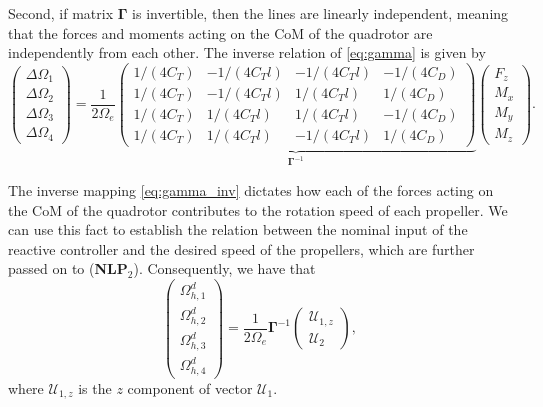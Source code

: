 Second, if matrix $\mathbf{\Gamma}$ is invertible, then the lines are linearly independent, meaning that the forces and moments acting on the CoM of the quadrotor are independently from each other. The inverse relation  of \eqref{eq:gamma} is given by
\begin{equation}
\begin{pmatrix}\Delta \Omega_1\\ \Delta \Omega_2\\ \Delta \Omega_3\\ \Delta \Omega_4\end{pmatrix} = \frac{1}{2\Omega_e}\underbrace{\begin{pmatrix}
1/(4C_T) & -1/(4C_Tl) & -1/(4C_Tl) & -1/(4C_D)\\
1/(4C_T) & -1/(4C_Tl) & 1/(4C_Tl) & 1/(4C_D)\\
1/(4C_T) & 1/(4C_Tl) & 1/(4C_Tl) & -1/(4C_D)\\
1/(4C_T) & 1/(4C_Tl) & -1/(4C_Tl) & 1/(4C_D)
\end{pmatrix}}_{\mathbf{\Gamma}^{-1}}
\begin{pmatrix}F_z \\M_x \\M_y \\M_z \end{pmatrix}.\label{eq:gamma_inv}%
\end{equation}

The inverse mapping \eqref{eq:gamma_inv} dictates how each of the forces acting on the CoM of the quadrotor contributes to the rotation speed of each propeller. We can use this fact to establish the relation between the nominal input of the reactive controller and the desired speed of the propellers, which are further passed on to (\textbf{NLP}$_2$). Consequently, we have that
\begin{equation*}
\begin{pmatrix}\Omega^d_{h,1}\\ \Omega^d_{h,2}\\ \Omega^d_{h,3}\\ \Omega^d_{h,4}\end{pmatrix} = \frac{1}{2\Omega_e}\mathbf{\Gamma}^{-1}\begin{pmatrix}\mathcal{U}_{1,z}\\ \mathcal{U}_2\end{pmatrix},
\end{equation*}
where $\mathcal{U}_{1,z}$ is the $z$ component of vector $\mathcal{U}_1$.